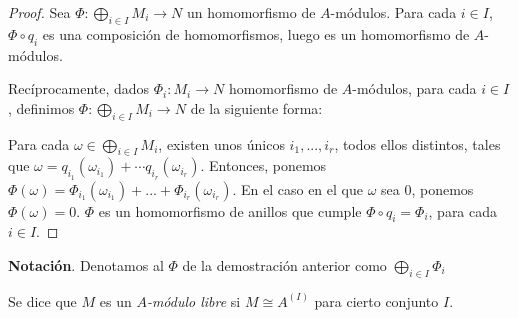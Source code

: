 \documentclass[../main.tex]{subfiles}
\begin{document}
\begin{proof}
	Sea $\Phi:\bigoplus_{i\in I} M_i \rightarrow N$ un homomorfismo de $A$-módulos. Para cada $i\in I$, $\Phi \circ q_i$ es una composición de homomorfismos, luego es un homomorfismo de $A$-módulos.
	
	Recíprocamente, dados $\Phi_i:M_i\rightarrow N$ homomorfismo de $A$-módulos, para cada $i\in I$, definimos $\Phi:\bigoplus_{i\in I} M_i\rightarrow N$ de la siguiente forma:
	
	Para cada $\omega \in \bigoplus_{i\in I} M_i$, existen unos únicos $i_1,...,i_r$, todos ellos distintos, tales que $\omega=q_{i_1}(\omega_{i_1})+\cdots q_{i_r}(\omega_{i_r})$. Entonces, ponemos $\Phi(\omega)=\Phi_{i_1}(\omega_{i_1})+...+\Phi_{i_r}(\omega_{i_r})$. En el caso en el que $\omega$ sea $0$, ponemos $\Phi(\omega)=0$. $\Phi$ es un homomorfismo de anillos que cumple $\Phi\circ q_i = \Phi_i$, para cada $i\in I$.
\end{proof}

\textbf{Notación}. Denotamos al $\Phi$ de la demostración anterior como $\bigoplus_{i\in I} \Phi_i$

\begin{definition}
	Se dice que $M$ es un \textit{$A$-módulo libre} si $M \cong A^{(I)}$ para cierto conjunto $I$.
\end{definition}
\end{document}
